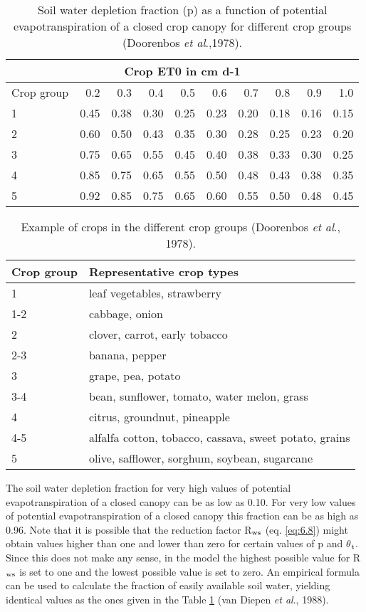 \begin{table}
	\caption{Soil water depletion fraction (p) as a function of potential evapotranspiration 
		of a closed crop canopy for different crop groups (Doorenbos {\it et al}.,1978).}
	\label{tbl:soilwatdeplfraction}
	\begin{tabularx}{\textwidth}{Xrrrrrrrrr}
		\hline
		\multicolumn{10}{c}{Crop ET0 in cm d-1}\\
		\hline
		Crop group & 0.2 & 0.3 & 0.4 & 0.5 & 0.6 & 0.7 & 0.8 & 0.9 & 1.0\\
		1 & 0.45 & 0.38 & 0.30 & 0.25 & 0.23 & 0.20 & 0.18 & 0.16 & 0.15\\
		2 & 0.60 & 0.50 & 0.43 & 0.35 & 0.30 & 0.28 & 0.25 & 0.23 & 0.20\\
		3 & 0.75 & 0.65 & 0.55 & 0.45 & 0.40 & 0.38 & 0.33 & 0.30 & 0.25\\
		4 & 0.85 & 0.75 & 0.65 & 0.55 & 0.50 & 0.48 & 0.43 & 0.38 & 0.35\\
		5 & 0.92 & 0.85 & 0.75 & 0.65 & 0.60 & 0.55 & 0.50 & 0.48 & 0.45\\
		\hline 
	\end{tabularx} 
\end{table}


\begin{table}
	\caption{Example of crops in the different crop groups (Doorenbos {\it et al}., 1978).}
	\label{tbl:ExampleCropGroups}
	\begin{tabularx}{\textwidth}{lX}
		\hline
		Crop group & Representative crop types\\
		\hline
		1 & leaf vegetables, strawberry\\     
		1-2 & cabbage, onion\\
		2 & clover, carrot, early tobacco\\     
		2-3 & banana, pepper\\
		3 & grape, pea, potato\\
		3-4 & bean, sunflower, tomato, water melon, grass\\
		4 & citrus, groundnut, pineapple\\
		4-5 & alfalfa cotton, tobacco, cassava, sweet potato, grains\\
		5 & olive, safflower, sorghum, soybean, sugarcane\\
		\hline
	\end{tabularx}
\end{table}

The soil water depletion fraction for very high values of potential evapotranspiration of a
closed canopy can be as low as 0.10. For very low values of potential evapotranspiration
of a closed canopy this fraction can be as high as 0.96.
Note that it is possible that the reduction factor R$_{{\rm ws}}$ (eq. \ref{eq:6.8}) might obtain 
values higher
than one and lower than zero for certain values of p and $\theta$$_{{\rm t}}$. Since this does not make
any sense, in the model the highest possible value for R$_{{\rm ws}}$ is set to one and the lowest
possible value is set to zero.
An empirical formula can be used to calculate the fraction of easily available soil water,
yielding identical values as the ones given in the Table \ref{tbl:soilwatdeplfraction} 
(van Diepen {\it et al}., 1988).


